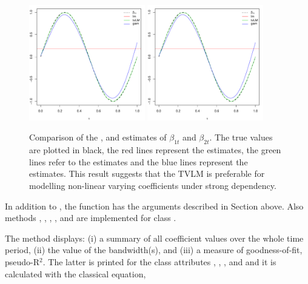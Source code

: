 \begin{figure}[!ht]
\centering
\includegraphics[page = 1, width = 0.45\textwidth]{Fig8} 
\includegraphics[page = 2, width = 0.45\textwidth]{Fig8} 
\caption{Comparison of the ,  and  estimates of $\beta_{1t}$ and $\beta_{2t}$. The true values are plotted in black, the red lines represent the  estimates, the green lines refer to the  estimates and the blue lines represent the  estimates. This result suggests that the TVLM is preferable for modelling non-linear varying coefficients under strong dependency.\label{fig:tvlm}}
\end{figure}

In addition to , the function  has the arguments described in Section  above. Also methods , , , ,  and  are implemented for class .

The  method displays: (i) a summary of all coefficient values over the whole time period, (ii) the value of the bandwidth(s), and  (iii) a measure of goodness-of-fit, pseudo-R$^2$. The latter is printed for the class attributes , , ,  and  and it is calculated with the classical equation,

